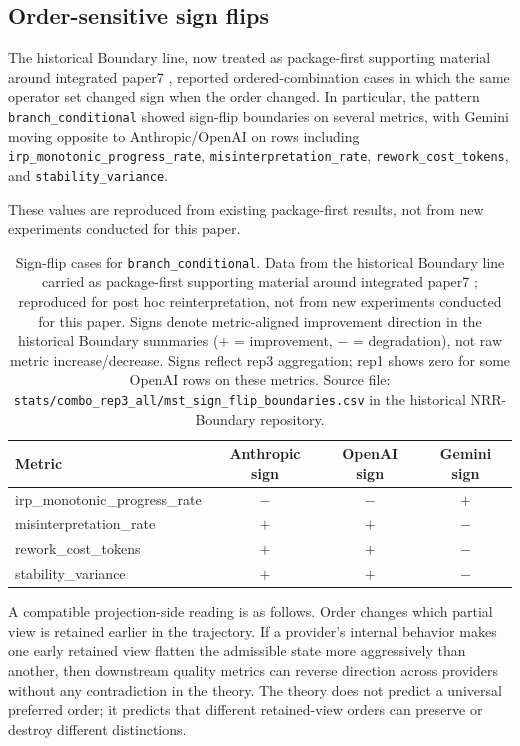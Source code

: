 \documentclass[11pt,a4paper]{article}
\begin{document}
\subsection{Order-sensitive sign flips}

The historical Boundary line, now treated as package-first supporting material around integrated paper7 \cite{saito2026boundary}, reported ordered-combination cases in which the same operator set changed sign when the order changed. In particular, the pattern \texttt{branch\_conditional} showed sign-flip boundaries on several metrics, with Gemini moving opposite to Anthropic/OpenAI on rows including \texttt{irp\_monotonic\_progress\_rate}, \texttt{misinterpretation\_rate}, \texttt{rework\_cost\_tokens}, and \texttt{stability\_variance}.

These values are reproduced from existing package-first results, not from new experiments conducted for this paper.

\begin{table}[h]
\centering
\small
\begin{tabular}{p{5.2cm}ccc}
\toprule
Metric & Anthropic sign & OpenAI sign & Gemini sign \\
\midrule
irp\_monotonic\_progress\_rate & $-$ & $-$ & $+$ \\
misinterpretation\_rate & $+$ & $+$ & $-$ \\
rework\_cost\_tokens & $+$ & $+$ & $-$ \\
stability\_variance & $+$ & $+$ & $-$ \\
\bottomrule
\end{tabular}
\caption{Sign-flip cases for \texttt{branch\_conditional}. Data from the historical Boundary line carried as package-first supporting material around integrated paper7 \cite{saito2026boundary}; reproduced for post hoc reinterpretation, not from new experiments conducted for this paper. Signs denote metric-aligned improvement direction in the historical Boundary summaries ($+$ = improvement, $-$ = degradation), not raw metric increase/decrease. Signs reflect rep3 aggregation; rep1 shows zero for some OpenAI rows on these metrics. Source file: \texttt{stats/combo\_rep3\_all/mst\_sign\_flip\_boundaries.csv} in the historical NRR-Boundary repository.}
\label{tab:boundary_signflip}
\end{table}

A compatible projection-side reading is as follows. Order changes which partial view is retained earlier in the trajectory. If a provider's internal behavior makes one early retained view flatten the admissible state more aggressively than another, then downstream quality metrics can reverse direction across providers without any contradiction in the theory. The theory does not predict a universal preferred order; it predicts that different retained-view orders can preserve or destroy different distinctions.
\end{document}
